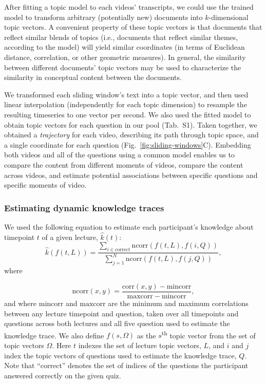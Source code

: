 \documentclass[10pt]{article}
\newcommand{\questions}{S1}
\begin{document}
After fitting a topic model to each videos' transcripts, we could use the
trained model to transform arbitrary (potentially new) documents into
$k$-dimensional topic vectors. A convenient property of these topic vectors is
that documents that reflect similar blends of topics (i.e., documents that
reflect similar themes, according to the model) will yield similar coordinates
(in terms of Euclidean distance, correlation, or other geometric measures). In
general, the similarity between different documents' topic vectors may be used
to characterize the similarity in conceptual content between the documents.

We transformed each sliding window's text into a topic vector, and then used
linear interpolation (independently for each topic dimension) to resample the
resulting timeseries to one vector per second. We also used the fitted model to
obtain topic vectors for each question in our pool (Tab.~\questions). Taken
together, we obtained a \textit{trajectory} for each video, describing its path
through topic space, and a single coordinate for each question
(Fig.~\ref{fig:sliding-windows}C). Embedding both videos and all of the
questions using a common model enables us to compare the content from different
moments of videos, compare the content across videos, and estimate potential
associations between specific questions and specific moments of video.


\subsubsection*{Estimating dynamic knowledge traces}\label{subsec:traces}

We used the following equation to estimate each participant's knowledge about
timepoint $t$ of a given lecture, $\hat{k}(t)$:
\begin{equation}
    \hat{k}\left(f(t, L)\right) = \frac{\sum_{i \in \mathrm{correct}}\mathrm{ncorr}\left(f(t, L), f(i, Q)\right)}{\sum_{j = 1}^N \mathrm{ncorr}\left(f(t, L), f(j, Q)\right)},
    \label{eqn:prop}
\end{equation}
where

\begin{equation}
    \mathrm{ncorr}(x, y) = \frac{\mathrm{corr}(x, y) - \mathrm{mincorr}}{\mathrm{maxcorr} - \mathrm{mincorr}},
\end{equation}
and where $\mathrm{mincorr}$ and $\mathrm{maxcorr}$ are the minimum and maximum
correlations between any lecture timepoint and question, taken over all
timepoints and questions across both lectures and all five question used to
estimate the knowledge trace. We also define $f(s, \Omega)$ as the
$s$\textsuperscript{th} topic vector from the set of topic vectors $\Omega$.
Here $t$ indexes the set of lecture topic vectors, $L$, and $i$ and $j$ index
the topic vectors of questions used to estimate the knowledge trace, $Q$. Note
that ``correct'' denotes the set of indices of the questions the participant
answered correctly on the given quiz.
\end{document}
